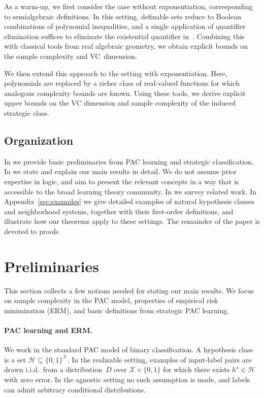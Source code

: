 \documentclass[11pt]{article}
\theoremstyle{plain}
\theoremstyle{definition}
\theoremstyle{remark}
\begin{document}
\begin{itemize}[leftmargin=1em,topsep=0em,itemsep=0.2em]
As a warm-up, we first consider the case without exponentiation,
corresponding to semialgebraic definitions.
In this setting, definable sets reduce to Boolean combinations of polynomial inequalities,
and a single application of quantifier elimination suffices
to eliminate the existential quantifier in~.
Combining this with classical tools from real algebraic geometry,
we obtain explicit bounds on the sample complexity and VC~dimension.

We then extend this approach to the setting with exponentiation.
Here, polynomials are replaced by a richer class of real-valued functions for which analogous complexity bounds are known.
Using these tools, we derive explicit upper bounds on the VC dimension
and sample complexity of the induced strategic class.

\end{itemize}

\subsection{Organization}
In  we provide basic preliminaries from PAC learning and strategic classification.
In  we state and explain our main results in detail.
We do not assume prior expertise in logic, and aim to present the relevant concepts
in a way that is accessible to the broad learning theory community.
In  we survey related work. In Appendix~\ref{sec:examples} we give detailed examples of natural hypothesis classes and neighborhood systems,
together with their first-order definitions,
and illustrate how our theorems apply to these settings. 
The remainder of the paper is devoted to proofs.


\section{Preliminaries}
\label{sec:prel}

This section collects a few notions needed for stating our main results.
We focus on sample complexity in the PAC model, properties of empirical
risk minimization (ERM), and basic definitions from strategic PAC learning.

\paragraph{PAC learning and ERM.}
We work in the standard PAC model of binary classification. A hypothesis
class is a set $\mathcal H\subseteq\{0,1\}^{\mathcal X}$. In the
realizable setting, examples of input-label pairs are drawn i.i.d.\ from a distribution~$D$ over
$\mathcal X\times\{0,1\}$ for which there exists $h^\star\in\mathcal H$
with zero error. In the agnostic setting no such assumption is made,
and labels can admit arbitrary conditional distributions.
\end{document}
